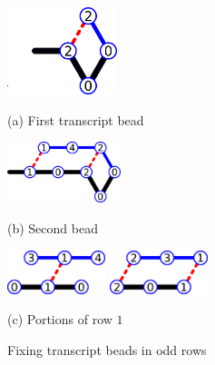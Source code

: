 


\begin{figure}
	\begin{minipage}{.35\textwidth}
		\centering
		\includegraphics[align=c,height=1in]{./Fig/CI_1n}\\
		\bigskip
		
		(a) First transcript bead
	\end{minipage}%
	\begin{minipage}{.2\textwidth}
		\centering
		\includegraphics[align=c,height=0.7in]{./Fig/CI_2n}\\
		\bigskip
		
		(b) Second bead
	\end{minipage}
	\begin{minipage}{.4\textwidth}
		\centering
		\includegraphics[align=c,height=0.5in]{./Fig/CI_3n}
		\bigskip
		\vspace{0.1in}
		\includegraphics[align=c,height=0.5in]{./Fig/CI_4n}
		\bigskip
		
		(c) Portions of row $1$
	\end{minipage}
	\caption{Fixing transcript beads in odd rows}
	\label{CI:1-4}
\end{figure}


